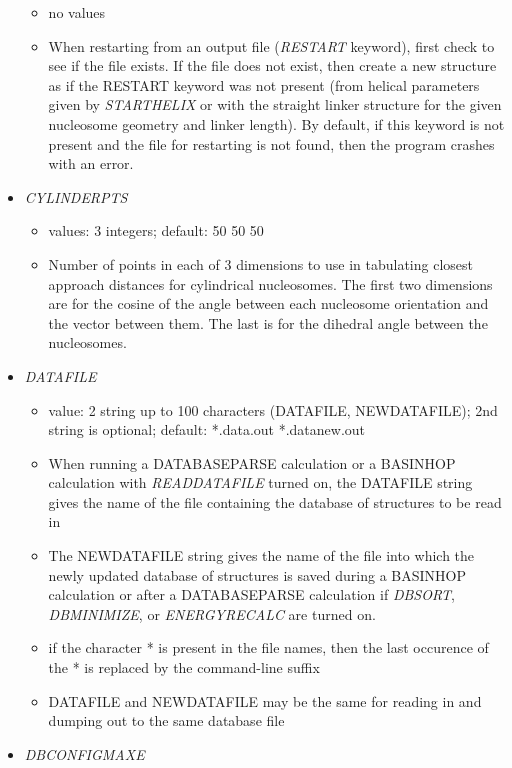 \documentclass[12pt,dvips]{article}
\begin{document}
\begin{itemize}
  \begin{itemize}
    \item no values
    \item When restarting from an output file ({\it RESTART} keyword), first check to see if the file exists. If the file does not exist, then create a new structure as if the RESTART keyword was not present (from helical parameters given by {\em STARTHELIX} or with the straight linker structure for the given nucleosome geometry and linker length). By default, if this keyword is not present and the file for restarting is not found, then the program crashes with an error.
  \end{itemize}
%
\item {\it CYLINDERPTS}
  \begin{itemize}
    \item values: 3 integers; default: 50 50 50 
    \item Number of points in each of 3 dimensions to use in tabulating closest approach distances for cylindrical nucleosomes. The first two dimensions are for the cosine of the angle between each nucleosome orientation and the vector between them. The last is for the dihedral angle between the nucleosomes.
  \end{itemize}
%
\item {\it DATAFILE}
  \begin{itemize}
    \item value: 2 string up to 100 characters (DATAFILE, NEWDATAFILE); 2nd string is optional; default: *.data.out *.datanew.out
    \item When running a DATABASEPARSE calculation or a BASINHOP calculation with {\em READDATAFILE} turned on, the DATAFILE string gives the name of the file containing the database of structures to be read in
    \item The NEWDATAFILE string gives the name of the file into which the newly updated database of structures is saved during a BASINHOP calculation or after a DATABASEPARSE calculation if {\em DBSORT}, {\em DBMINIMIZE}, or {\em ENERGYRECALC} are turned on.
    \item if the character * is present in the file names, then the last occurence of the * is replaced by the command-line suffix
    \item DATAFILE and NEWDATAFILE may be the same for reading in and dumping out to the same database file
  \end{itemize}
%
\item {\it DBCONFIGMAXE}
  \begin{itemize}

\end{itemize}
\end{itemize}
\end{document}
